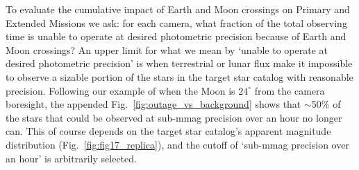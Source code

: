 To evaluate the cumulative impact of Earth and Moon crossings on \tesss 
Primary and Extended Missions we ask: for each camera, what fraction of the 
total observing time is \tess unable to operate at desired photometric 
precision because of Earth and Moon crossings?
An upper limit for what we mean by `unable to operate at desired photometric 
precision' is when terrestrial or lunar flux make it impossible to observe a sizable portion of the stars in the \tess target star catalog with reasonable precision.
Following our example of when the Moon is $24^\circ$ from the camera boresight, 
the appended Fig.~\ref{fig:outage_vs_background} shows that $\sim$50\% of the 
stars that could be observed at sub-mmag precision over an hour no longer can.
This of course depends on the target star catalog's apparent magnitude 
distribution (Fig.~\ref{fig:fig17_replica}), and the cutoff of `sub-mmag 
precision over an hour' is arbitrarily selected.

